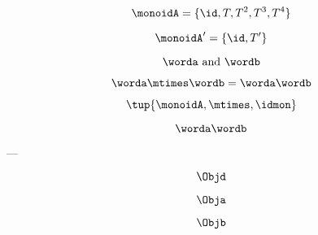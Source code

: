 {\begin{forslides}
        $$\monoidA = \{ \id, T, T^2, T^3, T^4 \}$$
        
        $$\monoidA' = \{ \id, T' \}$$
        
        \begin{equation*}
            \worda \text{ and } \wordb
        \end{equation*}
        
        \begin{equation*}
            \label{eq:string-semigroup-wordab-2}
            \worda \mtimes  \wordb =  \worda \wordb
        \end{equation*}
        
        
        $$ \tup{ \monoidA, \mtimes, \idmon} $$
        
        
        \begin{equation*}
            \label{eq:string-semigroup-wordab-concat-2}
            \worda \wordb
        \end{equation*}
        
        ---
        
        \begin{equation}
            \label{eq:00}
            \Objd
        \end{equation}
        
        \begin{equation}
            \label{eq:01}
            \Obja
        \end{equation}
        
        \begin{equation}
            \label{eq:02}
            \Objb
        \end{equation}
        

\end{forslides}}
